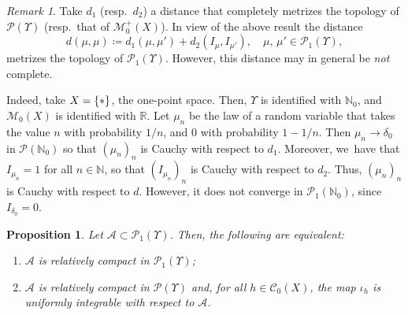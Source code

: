 \documentclass[10pt]{amsart}
\newtheorem{proposition}[theorem]{Proposition}
\theoremstyle{definition}
\theoremstyle{remark}
\newtheorem{remark}[theorem]{Remark}
\DeclarePairedDelimiter{\set}{\lbrace}{\rbrace}
\begin{document}
\begin{remark}
Take $d_{1}$ (resp.\ $d_{2}$) a distance that completely metrizes the topology of $\mathscr{P}(\varUpsilon)$ (resp.\ that of $\mathscr{M}^{+}_{0}(X)$).
In view of the above result the distance
\begin{equation*}
d(\mu, \mu) \coloneq d_{1}(\mu, \mu') + d_{2}(I_{\mu}, I_{\mu'}), \quad \mu,\, \mu' \in \mathscr{P}_{1}(\varUpsilon),
\end{equation*}
metrizes the topology of $\mathscr{P}_{1}(\varUpsilon)$.
However, this distance may in general be \emph{not} complete.

Indeed, take $X = \set{ \ast }$, the one-point space.
Then, $\varUpsilon$ is identified with $\mathbb{N}_0$, and $\mathscr{M}_{0}(X)$ is identified with $\mathbb{R}$.
Let $\mu_{n}$ be the law of a random variable that takes the value $n$ with probability $1/n$, and $0$ with probability $1 -1/n$.
Then $\mu_{n} \to \delta_{0}$ in $\mathscr{P}(\mathbb{N}_0)$ so that $(\mu_{n})_n$ is Cauchy with respect to $d_{1}$.
Moreover, we~have that $I_{\mu_{n}} = 1$ for all $n \in \mathbb{N}$, so that $(I_{\mu_{n}})_n$ is Cauchy with respect to $d_{2}$.
Thus, $(\mu_{n})_n$ is Cauchy with respect to $d$.
However, it does not converge in $\mathscr{P}_{1}(\mathbb{N}_0)$, since $I_{\delta_0}=0$.
\end{remark}

\begin{proposition}\label{t:p1-compactness}
Let $\mathscr{A} \subset \mathscr{P}_{1}(\varUpsilon)$.
Then, the following are equivalent:
\begin{enumerate}[$(\rm i)$,wide]
\item\label{i:compact-p1} $\mathscr{A}$ is relatively compact in $\mathscr{P}_{1}(\varUpsilon)$;
\item\label{i:ui} $\mathscr{A}$ is relatively compact in $\mathscr{P}(\varUpsilon)$ and, for all $h \in \mathscr{C}_{0}(X)$, the map $\iota_{h}$ is uniformly integrable with respect to $\mathscr{A}$.
\end{enumerate}
\end{proposition}
\end{document}
